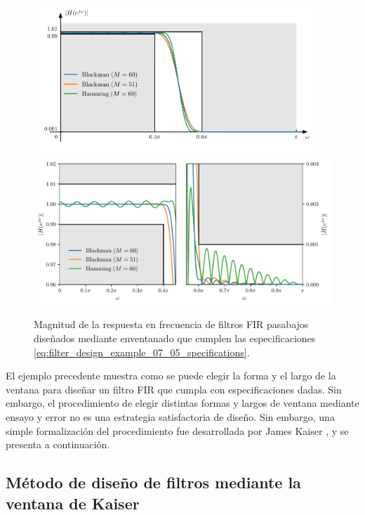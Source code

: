 \documentclass[a4paper]{report}
\begin{document}
\begin{figure}[!htb]
 \begin{center}
 \includegraphics[width=0.94\textwidth]{figuras/filter_design_example_07_05_with_windowing.pdf}
 \includegraphics[width=1\textwidth]{figuras/filter_design_example_07_05_with_windowing_zoom.pdf}
 \caption{\label{fig:filter_design_example_07_05_with_windowing} Magnitud de la respuesta en frecuencia de filtros FIR pasabajos diseñados mediante enventanado que cumplen las especificaciones \ref{eq:filter_design_example_07_05_specifications}.}
 \end{center}
\end{figure}

El ejemplo precedente muestra como se puede elegir la forma y el largo de la ventana para diseñar un filtro FIR que cumpla con especificaciones dadas. Sin embargo, el procedimiento de elegir distintas formas y largos de ventana mediante ensayo y error no es una estrategia satisfactoria de diseño. Sin embargo, una simple formalización del procedimiento fue desarrollada por James Kaiser \cite{kaiser1980use}, y se presenta a continuación.

\subsection{Método de diseño de filtros mediante la ventana de Kaiser}
\end{document}
